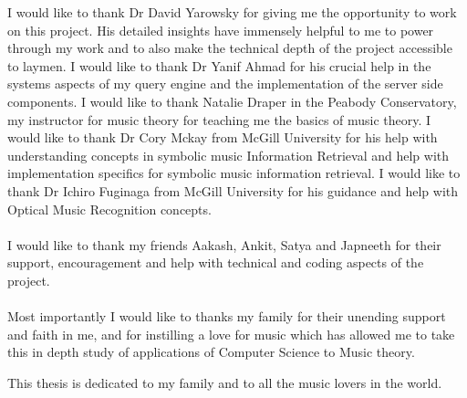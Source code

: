 \begin{frontmatter}
\begin{acknowledgment}

\noindent I would like to thank Dr David Yarowsky for giving me the opportunity to work on this project. His detailed insights have immensely helpful to me to power through my work and to also make the technical depth of the project accessible to laymen. I would like to thank Dr Yanif Ahmad for his crucial help in the systems aspects of my query engine and the implementation of the server side components. I would like to thank Natalie Draper in the Peabody Conservatory, my instructor for music theory for teaching me the basics of music theory. I would like to thank Dr Cory Mckay from McGill University for his help with understanding concepts in symbolic music Information Retrieval and help with implementation specifics for symbolic music information retrieval. I would like to thank Dr Ichiro Fuginaga from McGill University for his guidance and help with Optical Music Recognition concepts. \\\\
I would like to thank my friends Aakash, Ankit, Satya and Japneeth for their support, encouragement and help with technical and coding aspects of the project. \\\\
Most importantly I would like to thanks my family for their unending support and faith in me, and for instilling a love for music which has allowed me to take this in depth study of applications of Computer Science to Music theory.

\end{acknowledgment}

\begin{dedication}
 
This thesis is dedicated to my family and to all the music lovers in the world. 

\end{dedication}

\tableofcontents

\listoftables

\listoffigures

\end{frontmatter}
